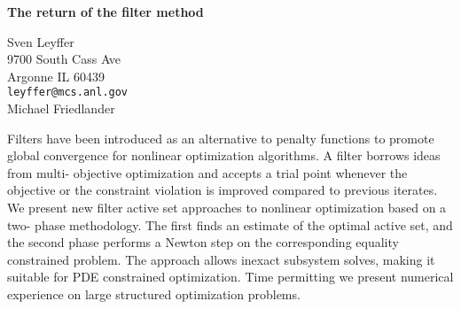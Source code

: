 \documentclass{report}
\begin{document}

\begin{center}
{\large
{\bf The return of the filter method}}

	Sven Leyffer \\
	9700 South Cass Ave \\
	Argonne IL 60439 \\
	{\tt leyffer@mcs.anl.gov} \\
	Michael Friedlander
\end{center}
Filters have been introduced as an alternative to penalty
functions to promote global convergence for nonlinear
optimization algorithms. A filter borrows ideas from multi-
objective optimization and accepts a trial point whenever
the objective or the constraint violation is improved
compared to previous iterates. We present new filter active
set approaches to nonlinear optimization based on a two-
phase methodology. The first finds an estimate of the
optimal active set, and the second phase performs a Newton
step on the corresponding equality constrained problem. The
approach allows inexact subsystem solves, making it suitable
for PDE constrained optimization. Time permitting we present
numerical experience on large structured optimization
problems.



\end{document}
